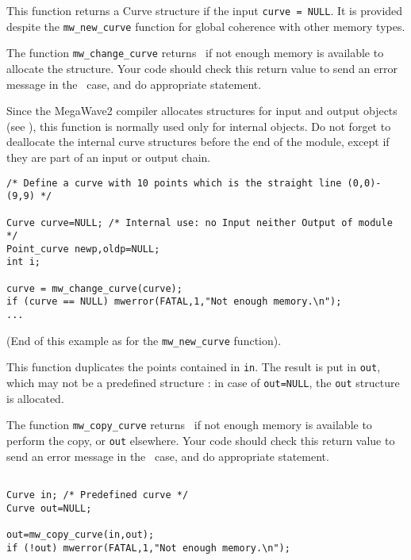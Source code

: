 \Description
This function returns a Curve structure if the input \verb+curve = NULL+.
It is provided despite the \verb+mw_new_curve+ function for
global coherence with other memory types.

The function \verb+mw_change_curve+ returns \Null\ if not enough memory is available to allocate the structure. 
Your code should check this return value to send an error message in the \Null\ case, and do appropriate statement.

Since the MegaWave2 compiler allocates structures for input and output 
objects (see \volI), this function is normally used only for internal objects.
Do not forget to deallocate the internal curve structures before the end
of the module, except if they are part of an input or output chain.

\Next
\Example
\begin{verbatim}
/* Define a curve with 10 points which is the straight line (0,0)-(9,9) */

Curve curve=NULL; /* Internal use: no Input neither Output of module */
Point_curve newp,oldp=NULL;
int i;

curve = mw_change_curve(curve);
if (curve == NULL) mwerror(FATAL,1,"Not enough memory.\n");
...
\end{verbatim}
(End of this example as for the \verb+mw_new_curve+ function).


\newpage %


\Description
This function duplicates the points contained in \verb+in+.
The result is put in \verb+out+, which may not be a predefined structure : in case 
of \verb+out=NULL+, the \verb+out+ structure is allocated.

The function \verb+mw_copy_curve+ returns \Null\ if not enough memory is available to perform
the copy, or \verb+out+ elsewhere.
Your code should check this return value to send an error message in the \Null\ case, and do appropriate statement.

\Next
\Example
\begin{verbatim}

Curve in; /* Predefined curve */
Curve out=NULL; 

out=mw_copy_curve(in,out);
if (!out) mwerror(FATAL,1,"Not enough memory.\n");
\end{verbatim}

